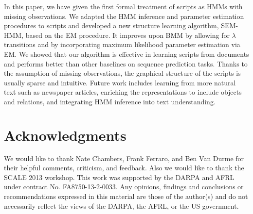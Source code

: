 \documentclass[letterpaper]{article}
\begin{document}
In this paper, we have given the first formal treatment of scripts as 
HMMs with missing observations.  
We adapted the HMM inference and parameter estimation procedures 
to scripts and developed a new structure 
learning algorithm, SEM-HMM, based on the EM procedure. 
It improves upon BMM by allowing for $\lambda$ transitions and by
incorporating maximum likelihood parameter estimation via EM. 
We showed that our algorithm is effective in learning scripts from 
documents and performs better than 
other baselines on sequence prediction tasks. Thanks to the 
assumption of missing observations, the graphical 
structure of the scripts is usually sparse and intuitive. 
Future work includes learning from more natural text such as 
newspaper articles, enriching the representations to include objects and 
relations, and integrating HMM inference into text understanding. 



\section*{Acknowledgments}
We would like to thank Nate Chambers, Frank Ferraro, and Ben Van Durme for their helpful comments, criticism, and feedback.  Also we would like to thank the SCALE 2013 workshop. This work was supported by the DARPA and AFRL under contract No. FA8750-13-2-0033. Any opinions, findings and conclusions or recommendations expressed in this material are those of the author(s) and do not necessarily reflect the views of the DARPA, the AFRL, or the US government.





\end{document}
